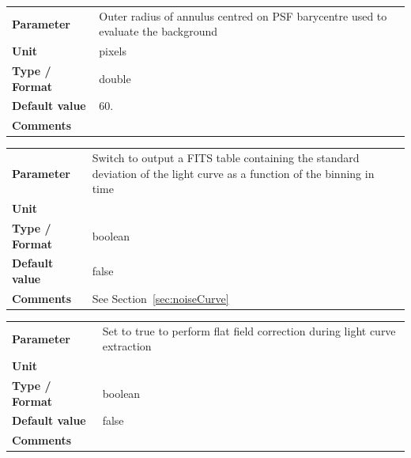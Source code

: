 \documentclass[11pt]{article}      %
\def\HCode#1{}
\def\htmlanchor#1{\HCode{<a id="#1"></a>}}
\begin{document}
\begin{table}[hb]
  \htmlanchor{radius_bkgOuter}
  \begin{tabular}{| l | p{13cm} |}
    \hline 
    {\bf Parameter} & Outer radius of annulus centred on PSF barycentre used to evaluate the background\\
    {\bf Unit} & pixels \\
    {\bf Type / Format} & double \\
    {\bf Default value} & 60.\\
    {\bf Comments} & \\
    \hline
  \end{tabular}
  \bigskip

  \htmlanchor{generateNoiseCurve}
  \begin{tabular}{| l | p{13cm} |}
    \hline 
    {\bf Parameter} & Switch to output a FITS table containing the standard deviation of the light curve as a function of the binning in time\\
    {\bf Unit} & \\
    {\bf Type / Format} & boolean\\
    {\bf Default value} & false\\
    {\bf Comments} & See Section~\ref{sec:noiseCurve}\\
    \hline
  \end{tabular}
  \bigskip

  \htmlanchor{subtractFlatField}
  \begin{tabular}{| l | p{13cm} |}
    \hline 
    {\bf Parameter} & Set to true to perform flat field correction during light curve extraction\\
    {\bf Unit} & \\
    {\bf Type / Format} & boolean \\
    {\bf Default value} & false\\
    {\bf Comments} & \\
    \hline
  \end{tabular}
  \bigskip


\end{table}
\end{document}
